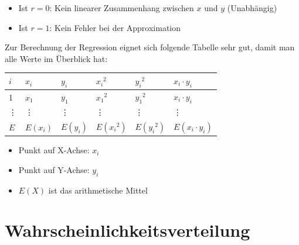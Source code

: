 \begin{itemize}
  \item Ist $r = 0$: Kein linearer Zusammenhang zwischen $x$ und $y$
    (Unabhängig)
  \item Ist $r = 1$: Kein Fehler bei der Approximation
\end{itemize}

Zur Berechnung der Regression eignet sich folgende Tabelle sehr gut,
damit man alle Werte im Überblick hat:

\begin{tabular}{|l|l|l|l|l|l|}
  \hline
  $i$    & $x_i$    & $y_i$    & ${x_i}^2$    & ${y_i}^2$  & $x_i \cdot y_i$ \\
  \hline
  \hline
  1      & $x_1$    & $y_1$    & ${x_1}^2$    & ${y_1}^2$  & $x_i \cdot y_i$ \\
  \vdots & \vdots   & \vdots   & \vdots       & \vdots     & \vdots \\
  \hline
  \hline
  $E$ & $E(x_i)$ & $E(y_i)$ & $E({x_i}^2)$ & $E({y_i}^2)$ & $E(x_i \cdot y_i)$ \\
  \hline
\end{tabular}
\begin{itemize}
  \item Punkt auf X-Achse: $x_i$
  \item Punkt auf Y-Achse: $y_i$
  \item $E(X)$ ist das arithmetische Mittel
\end{itemize}

\section{Wahrscheinlichkeitsverteilung}
